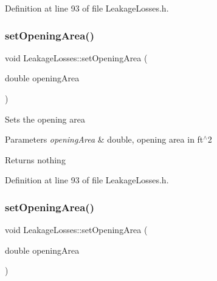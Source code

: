 Definition at line 93 of file Leakage\+Losses.\+h.

\mbox{\label{class_leakage_losses_a417c9914af6b283695bdbd5e92451f9e}} 
\subsubsection{\texorpdfstring{set\+Opening\+Area()}{setOpeningArea()}\hspace{0.1cm}{\footnotesize\ttfamily [2/3]}}
{\footnotesize\ttfamily void Leakage\+Losses\+::set\+Opening\+Area (\begin{DoxyParamCaption}\item[{double}]{opening\+Area }\end{DoxyParamCaption})\hspace{0.3cm}{\ttfamily [inline]}}

Sets the opening area


\begin{DoxyParams}{Parameters}
{\em opening\+Area} & double, opening area in ft$^\wedge$2\\
\hline
\end{DoxyParams}
\begin{DoxyReturn}{Returns}
nothing 
\end{DoxyReturn}


Definition at line 93 of file Leakage\+Losses.\+h.

\mbox{\label{class_leakage_losses_a417c9914af6b283695bdbd5e92451f9e}} 
\subsubsection{\texorpdfstring{set\+Opening\+Area()}{setOpeningArea()}\hspace{0.1cm}{\footnotesize\ttfamily [3/3]}}
{\footnotesize\ttfamily void Leakage\+Losses\+::set\+Opening\+Area (\begin{DoxyParamCaption}\item[{double}]{opening\+Area }\end{DoxyParamCaption})\hspace{0.3cm}{\ttfamily [inline]}}

